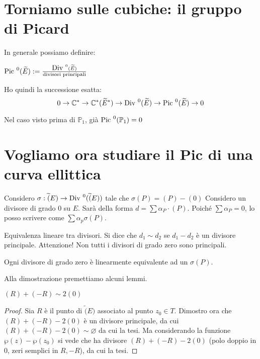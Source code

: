 \section{Torniamo sulle cubiche: il gruppo di Picard}
In generale possiamo definire:

\begin{definizione}
$\mbox{Pic }^0(\widetilde{E}) := \frac{\mbox{Div }^0(\widetilde{E})}{\text{divisori principali}}$
\end{definizione}

\begin{osservazione}
Ho quindi la successione esatta:
$$0 \rightarrow \mathbb{C}^* \rightarrow \mathbb{C}^*(\widetilde{E}^*) \rightarrow \mbox{Div }^0(\widetilde{E})\rightarrow \mbox{Pic }^0(\widetilde{E})\rightarrow 0$$
\end{osservazione}

Nel caso visto prima di $\mathbb{P}_1$, già $\mbox{Pic }^0(\mathbb{P}_1)=0$


\section{Vogliamo ora studiare il Pic di una curva ellittica}

Considero $\sigma : \widetilde(E) \rightarrow \mbox{Div }^0(\widetilde(E))$ tale che $\sigma(P)=(P)-(0)$
Considero un divisore di grado $0$ su $E$. Sarà della forma $d = \sum\alpha_P\cdot(P)$.
Poiché $\sum \alpha_P=0$, lo posso scrivere come $\sum\alpha_p \sigma(P)$.

\begin{definizione}
Equivalenza lineare tra divisori. Si dice che $d_1 \sim d_2$ se $d_1-d_2$ è un divisore principale. Attenzione! Non tutti i divisori di grado zero sono principali.
\end{definizione}

\begin{teorema}
Ogni divisore di grado zero è linearmente equivalente ad un $\sigma(P)$.
\end{teorema}

Alla dimostrazione premettiamo alcuni lemmi. 
\begin{lemma}
$(R) + (-R) \sim 2(0)$
\end{lemma}
\begin{proof}
Sia $R$ è il punto di $\widetilde(E)$ associato al punto $z_0 \in T$.
Dimostro ora che $(R)+(-R)-2(0)$ è un divisore principale, da cui $(R)+(-R)-2(0) \sim \varnothing$ da cui la tesi.
Ma considerando la funzione $\wp(z)-\wp(z_0)$ si vede che ha divisore $(R)+(-R)-2(0)$ (polo doppio in $0$, zeri semplici in $R,-R$), da cui la tesi.
\end{proof}


